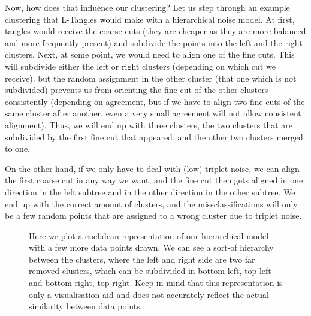 Now, how does that influence our clustering? Let us step through an example clustering that L-Tangles would make with a hierarchical noise model. 
At first, tangles would receive the coarse cuts (they are cheaper as they are more balanced and more frequently present) and subdivide the points into the
left and the right clusters. Next, at some point, we would need to align one of the fine cuts. This will subdivide either the left or right clusters (depending on which cut we receive). but
the random assignment in the other cluster (that one which is not subdivided) prevents us from orienting the fine cut of the other clusters consistently (depending on agreement, but if we 
have to align two fine cuts of the same cluster after another, even a very small agreement will not allow consistent alignment). Thus, we will end up with three clusters, the two clusters that are
subdivided by the first fine cut that appeared, and the other two clusters merged to one. 

On the other hand, if we only have to deal with (low) triplet noise, we can align the first coarse cut in any way we want, and the fine cut then gets aligned in one direction in the left subtree
and in the other direction in the other subtree. We end up with the correct amount of clusters, and the missclassifications will only be a few random points that are assigned to a wrong cluster due to triplet noise.


\begin{figure}[ht]
    \centering
    \resizebox{0.8\textwidth}{!}{}
    \caption{
        Here we plot a euclidean representation of our hierarchical model with a few more data points drawn. We can see a sort-of hierarchy between the clusters, where
        the left and right side are two far removed clusters, which can be subdivided in bottom-left, top-left and bottom-right, top-right.
        Keep in mind that this representation is only a visualisation aid and does not accurately reflect the actual similarity between data points.
    }
    \label{fig:hier_noise_repr}
\end{figure}


